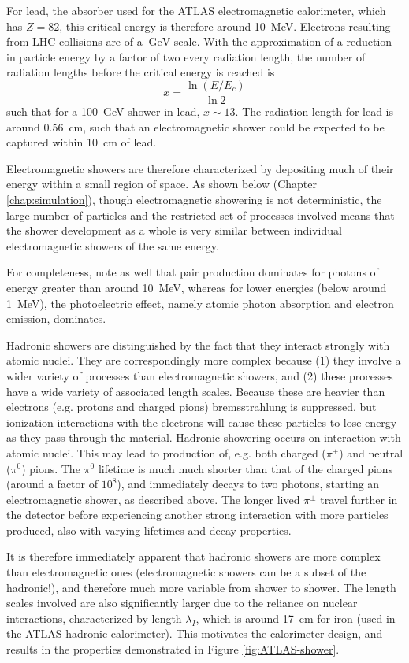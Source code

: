 For lead, the absorber used for the ATLAS electromagnetic calorimeter, which has $Z=82$, this critical energy 
is therefore around \SI{10}{\MeV}. Electrons resulting from LHC collisions are of a $\SI{}{\GeV}$ scale. 
With the approximation of a reduction in particle energy by a factor of two every radiation length, the number of radiation lengths before the critical energy is reached is 
\begin{equation}
x = \frac{\ln{(E/E_{c})}}{\ln{2}}
\end{equation}
such that for a \SI{100}{\GeV} shower in lead, $x\sim 13$. The radiation length for lead is around \SI{0.56}{\cm},
such that an electromagnetic shower could be expected to be captured within \SI{10}{\cm} of lead. 

Electromagnetic showers are therefore characterized by depositing much of their energy within a small region 
of space. As shown below (Chapter \ref{chap:simulation}), though electromagnetic showering is not deterministic, 
the large number of particles and the restricted set of processes involved means that the shower development as a whole 
is very similar between individual electromagnetic showers of the same energy.

For completeness, note as well that pair production dominates for photons of energy greater than around \SI{10}{\MeV}, 
whereas for lower energies (below around \SI{1}{\MeV}), the photoelectric effect, namely atomic photon absorption and electron emission, dominates.

Hadronic showers are distinguished by the fact that they interact strongly with atomic nuclei. They are 
correspondingly more complex because (1) they involve a wider variety of processes than electromagnetic 
showers, and (2) these processes have a wide variety of associated length scales. Because these are 
heavier than electrons (e.g. protons and charged pions) bremsstrahlung is suppressed, but ionization interactions 
with the electrons will cause these particles to lose energy as they pass through the material. Hadronic 
showering occurs on interaction with atomic nuclei. This may lead to production of, e.g. both charged ($\pi^{\pm}$)
and neutral ($\pi^{0}$) pions. The $\pi^{0}$ lifetime is much much shorter than that of the charged pions (around 
a factor of $10^8$), and immediately decays to two photons, starting an electromagnetic shower, as described 
above. The longer lived $\pi^{\pm}$ travel further in the detector before experiencing another strong interaction 
with more particles produced, also with varying lifetimes and decay properties. 

It is therefore immediately apparent that hadronic showers are more complex than electromagnetic ones 
(electromagnetic showers can be a subset of the hadronic!), and therefore much more variable from shower 
to shower. The length scales involved are also significantly larger due to the reliance on nuclear interactions,
characterized by length $\lambda_{I}$, which is around \SI{17}{\cm} for iron (used in the ATLAS hadronic calorimeter). 
This motivates the calorimeter design, and results in the properties demonstrated in Figure \ref{fig:ATLAS-shower}.
